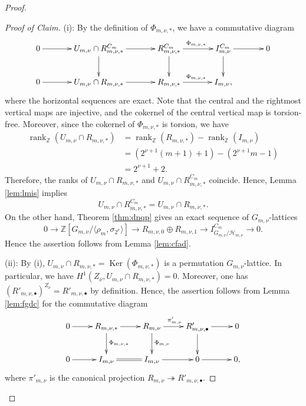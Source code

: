 \documentclass[10pt,a4paper]{amsart}
\newcommand{\Z}{\mathbb{Z}}
\newcommand{\cH}{\mathcal{H}}
\DeclareMathOperator{\Ker}{Ker}
\DeclareMathOperator{\rk}{rank}
\begin{document}
\begin{proof}
\begin{proof}[Proof of Claim]
(i): By the definition of $\Phi_{m,\nu,\ast}$, we have a commutative diagram
\begin{equation*}
\xymatrix@C=35pt{
0\ar[r]& U_{m,\nu}\cap R_{m,\nu,\ast}^{C_{m}} \ar[r] \ar[d] & R_{m,\nu,\ast}^{C_{m}} \ar[r]^{\Phi_{m,\nu,\ast}}\ar[d]& I_{m,\nu}^{C_{m}} \ar[r]\ar[d]& 0\\
0\ar[r]& U_{m,\nu}\cap R_{m,\nu,\ast} \ar[r] & R_{m,\nu,\ast} \ar[r]^{\Phi_{m,\nu,\ast}} & I_{m,\nu},&
}
\end{equation*}
where the horizontal sequences are exact. Note that the central and the rightmost vertical maps are injective, and the cokernel of the central vertical map is torsion-free. Moreover, since the cokernel of $\Phi_{m,\nu,\ast}$ is torsion, we have 
\begin{align*}
\rk_{\Z}(U_{m,\nu}\cap R_{m,\nu,\ast})&=\rk_{\Z}(R_{m,\nu,\ast})-\rk_{\Z}(I_{m,\nu})\\
&=(2^{\nu+1}(m+1)+1)-(2^{\nu+1}m-1)\\
&=2^{\nu+1}+2. 
\end{align*}
Therefore, the ranks of $U_{m,\nu}\cap R_{m,\nu,\ast}$ and $U_{m,\nu}\cap R_{m,\nu,\ast}^{C_{m}}$ coincide. Hence, Lemma \ref{lem:lmis} implies
\begin{equation*}
U_{m,\nu}\cap R_{m,\nu,\ast}^{C_{m}}=U_{m,\nu}\cap R_{m,\nu,\ast}. 
\end{equation*}
On the other hand, Theorem \ref{thm:dnqp} gives an exact sequence of $G_{m,\nu}$-lattices
\begin{equation*}
0\rightarrow \Z[G_{m,\nu}/\langle \rho_{m},\sigma_{2^{\nu}} \rangle]\rightarrow R_{m,\nu,0}\oplus R_{m,\nu,1} \rightarrow I_{G_{m,\nu}/\cH_{m,\nu}}^{C_{m}}\rightarrow 0. 
\end{equation*}
Hence the assertion follows from Lemma \ref{lem:cfad}. 

(ii): By (i), $U_{m,\nu}\cap R_{m,\nu,\ast}=\Ker(\Phi_{m,\nu,\ast})$ is a permutation $G_{m,\nu}$-lattice. In particular, we have $H^{1}(Z_{\nu},U_{m,\nu}\cap R_{m,\nu,\ast})=0$. Moreover, one has $(R'_{m,\nu,\bullet})^{Z_{\nu}}=R'_{m,\nu,\bullet}$ by definition. Hence, the assertion follows from Lemma \ref{lem:fgdc} for the commutative diagram
\begin{equation*}
\xymatrix{
0\ar[r]& R_{m,\nu,\ast} \ar[r] \ar[d]^{\Phi_{m,\nu,\ast}} & R_{m,\nu} \ar[r]^{\pi'_{m,\nu}}\ar[d]^{\Phi_{m,\nu}}& R'_{m,\nu,\bullet} \ar[r]\ar[d]& 0\\
0\ar[r]& I_{m,\nu} \ar@{=}[r] & I_{m,\nu} \ar[r] & 0 \ar[r]&0, 
}
\end{equation*}
where $\pi'_{m,\nu}$ is the canonical projection $R_{m,\nu}\twoheadrightarrow R'_{m,\nu,\bullet}$. 
\end{proof}


\end{proof}
\end{document}
